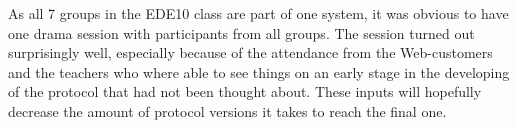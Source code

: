 As all 7 groups in the EDE10 class are part of one system, it was obvious to have one drama session with participants from all groups. The session turned out surprisingly well, especially because of the attendance from the Web-customers and the teachers who where able to see things on an early stage in the developing of the protocol that had not been thought about. These inputs will hopefully decrease the amount of protocol versions it takes to reach the final one.

